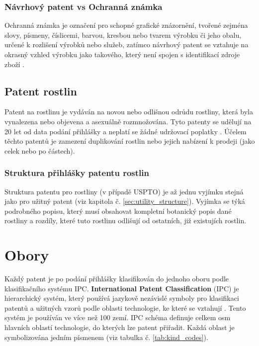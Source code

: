 \subsubsection{Návrhový patent vs Ochranná známka}
Ochranná známka je označení pro schopné grafické znázornění, tvořené zejména slovy, písmeny, číslicemi, barvou, kresbou nebo tvarem výrobku či jeho obalu, určené k rozlišení výrobků nebo služeb\cite{ceskoOchranna}, zatímco návrhový patent se vztahuje na okrasný vzhled výrobku jako takového, který není spojen s identifikací zdroje zboží \cite{designTrademark}.

\subsection{Patent rostlin}
Patent na rostlinu je vydáván na novou nebo odlišnou odrůdu rostliny, která byla vynalezena nebo objevena a asexuálně rozmnožována. Tyto patenty se udělují na 20 let od data podání přihlášky a neplatí se žádné udržovací poplatky \cite{usptoPlantPatent, patentIntroduction}. Účelem těchto patentů je zamezení duplikování rostlin nebo jejich nabízení k prodeji (jako celek nebo po částech).
\subsubsection{Struktura přihlášky patentu rostlin}
Struktura patentu pro rostliny (v případě \gls{USPTO}) je až jednu vyjímku stejná jako pro užitný patent (viz kapitola č. \ref{sec:utility_structure}). Vyjímka se týká podrobného popisu, který musí obsahovat kompletní botanický popis dané rostliny a rozdíly, které tuto rostlinu odlišují od ostatních, již existujích rostlin.

\section{Obory}
Každý patent je po podání přihlášky klasifikován do jednoho oboru podle klasifikačního systému \gls{IPC}. \textbf{International Patent Classification} (\gls{IPC}) je hierarchický systém, který používá jazykově nezávislé symboly pro klasifikaci patentů a užitných vzorů podle oblasti technologie, ke které se vztahují \cite{espacenetIPC}. Tento systém je používán ve více než 100 zemí. 
\newline
\indent \gls{IPC} schéma definuje celkem osm hlavních oblastí technologie, do kterých lze patent přiřadit. Každá oblast je symbolizována jedním písmenem (viz tabulka č. \ref{tab:kind_codes}).

